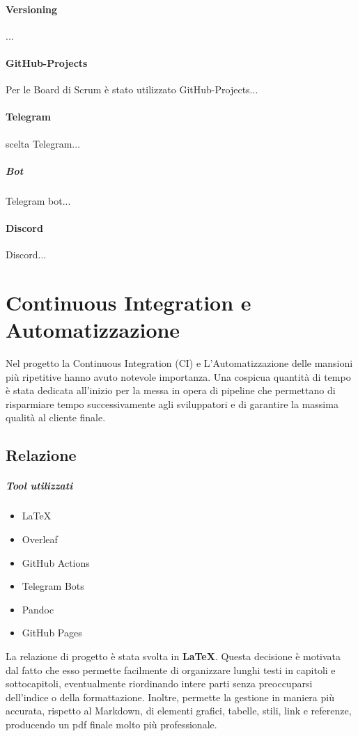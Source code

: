     \paragraph{Versioning}
    ...
    
    \paragraph{GitHub-Projects}
    Per le Board di Scrum è stato utilizzato GitHub-Projects...
    
    \paragraph{Telegram}
    scelta Telegram...
        \subparagraph{Bot} 
        Telegram bot...
    
    \paragraph{Discord}
    Discord... 

\section{Continuous Integration e Automatizzazione}
\label{chap:CI}
Nel progetto la Continuous Integration (CI) e L'Automatizzazione delle mansioni più ripetitive hanno avuto notevole importanza. Una cospicua quantità di tempo è stata dedicata all'inizio per la messa in opera di pipeline che permettano di risparmiare tempo successivamente agli sviluppatori e di garantire la massima qualità al cliente finale.
    \subsection{Relazione}
        \subparagraph{Tool utilizzati}
        \begin{itemize}
            \item \LaTeX
            \item Overleaf
            \item GitHub Actions
            \item Telegram Bots
            \item Pandoc
            \item GitHub Pages
        \end{itemize}
        La relazione di progetto è stata svolta in \textbf{\LaTeX}. Questa decisione è motivata dal fatto che esso permette facilmente di organizzare lunghi testi in capitoli e sottocapitoli, eventualmente riordinando intere parti senza preoccuparsi dell'indice o della formattazione. Inoltre, permette la gestione in maniera più accurata, rispetto al Markdown, di elementi grafici, tabelle, stili, link e referenze, producendo un pdf finale molto più professionale. 
        
